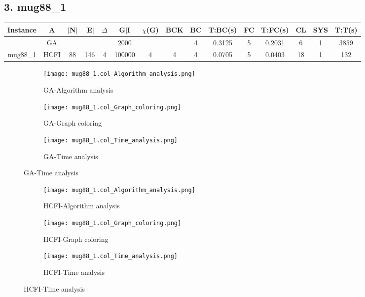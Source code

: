 \documentclass[10pt]{article}
\begin{document}
\subsection*{\hspace{0,9073976cm} 3. mug88\_1}
\begin{table}[H]
\centering
\begin{tabular}{|c|c|c|c|c|c|c|c|c|c|c|c|c|c|c|}
\hline
Instance& A &$|$N$|$ & $|$E$|$ & $\Delta$ & G$|$I & $\chi$(G) &BCK&BC & T:BC(s) & FC & T:FC(s) & CL & SYS & T:T(s) \\ \hline \hline


	&GA&       &                   &                     &2000         &     \cellcolor{yellow} & {\cellcolor{yellow}}& {{\cellcolor{green}4}}
& 0.3125      & 5       &0.2031                    & 6                   & 1         &3859         \\ \cline{2-2} \cline{6-6} \cline{9-15}
 \multirow{-2}{*}{mug88\_1} &HCFI   &\multirow{-2}{*}{88}   &\multirow{-2}{*}{146}     &\multirow{-2}{*}{4}     &100000     &\multirow{-2}{*}{\cellcolor{yellow}4}      & \multirow{-2}{*}{\cellcolor{yellow}4}    &{\cellcolor{green}4}     &0.0705         &5    &0.0403         &18    &1     & 132       \\ \hline 

\end{tabular}
\end{table}
\graphicspath{{./Core1/Solutions/GA/mug88_1.col}}
\begin{figure}[H]
\begin{subfigure}{.33\textwidth}
  \centering
  \texttt{[image: mug88\_1.col\_Algorithm\_analysis.png]}
  \caption{GA-Algorithm analysis}
   \label{fig:subfig1}
\end{subfigure}%
\begin{subfigure}{.33\textwidth}
  \centering
  \texttt{[image: mug88\_1.col\_Graph\_coloring.png]}
  \caption{GA-Graph coloring}
  \label{fig:subfig2}
\end{subfigure}
\begin{subfigure}{.33\textwidth}
  \centering
  \texttt{[image: mug88\_1.col\_Time\_analysis.png]}
  \caption{GA-Time analysis}
  \end{subfigure}
\end{figure}
\graphicspath{{./Core1/Solutions/HCFI/mug88_1.col}}
\begin{figure}[H]
\centering
\begin{subfigure}{.33\textwidth}
  \centering
  \texttt{[image: mug88\_1.col\_Algorithm\_analysis.png]}
  \caption{HCFI-Algorithm analysis}
   \label{fig:subfig1}
\end{subfigure}%
\begin{subfigure}{.33\textwidth}
  \centering
  \texttt{[image: mug88\_1.col\_Graph\_coloring.png]}
  \caption{HCFI-Graph coloring}
  \label{fig:subfig2}
\end{subfigure}
\begin{subfigure}{.33\textwidth}
  \centering
  \texttt{[image: mug88\_1.col\_Time\_analysis.png]}
  \caption{HCFI-Time analysis}
  \label{fig:subfig2}
\end{subfigure}
\end{figure}
\end{document}
